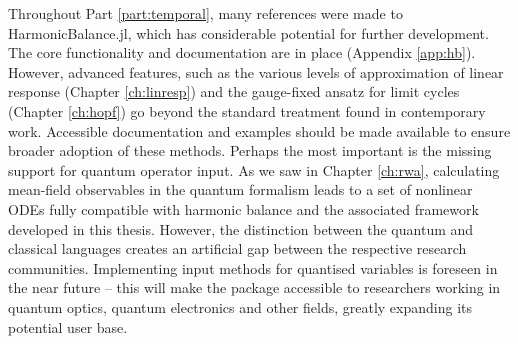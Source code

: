 Throughout Part \ref{part:temporal}, many references were made to HarmonicBalance.jl, which has considerable potential for further development. The core functionality and documentation are in place (Appendix \ref{app:hb}). However, advanced features, such as the various levels of approximation of linear response (Chapter \ref{ch:linresp}) and the gauge-fixed ansatz for limit cycles (Chapter \ref{ch:hopf}) go beyond the standard treatment found in contemporary work. Accessible documentation and examples should be made available to ensure broader adoption of these methods. Perhaps the most important is the missing support for quantum operator input. As we saw in Chapter \ref{ch:rwa}, calculating mean-field observables in the quantum formalism leads to a set of nonlinear ODEs fully compatible with harmonic balance and the associated framework developed in this thesis. However, the distinction between the quantum and classical languages creates an artificial gap between the respective research communities. Implementing input methods for quantised variables is foreseen in the near future -- this will make the package accessible to researchers working in quantum optics, quantum electronics and other fields, greatly expanding its potential user base. 